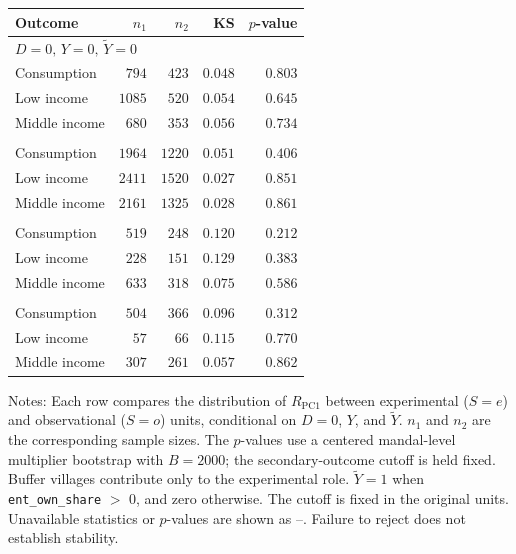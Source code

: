\begin{threeparttable}
\begin{tabular}{lrrrr}
\toprule
Outcome & $n_1$ & $n_2$ & KS & $p$-value \\
\midrule
\multicolumn{5}{l}{$D=0,\,Y=0,\,\widetilde{Y}=0$}\\
\quad Consumption & $794$ & $423$ & $0.048$ & $0.803$ \\
\quad Low income & $1085$ & $520$ & $0.054$ & $0.645$ \\
\quad Middle income & $680$ & $353$ & $0.056$ & $0.734$ \\
\addlinespace[0.6em]
\multicolumn{5}{l}{$D=0,\,Y=0,\,\widetilde{Y}=1$}\\
\quad Consumption & $1964$ & $1220$ & $0.051$ & $0.406$ \\
\quad Low income & $2411$ & $1520$ & $0.027$ & $0.851$ \\
\quad Middle income & $2161$ & $1325$ & $0.028$ & $0.861$ \\
\addlinespace[0.6em]
\multicolumn{5}{l}{$D=0,\,Y=1,\,\widetilde{Y}=0$}\\
\quad Consumption & $519$ & $248$ & $0.120$ & $0.212$ \\
\quad Low income & $228$ & $151$ & $0.129$ & $0.383$ \\
\quad Middle income & $633$ & $318$ & $0.075$ & $0.586$ \\
\addlinespace[0.6em]
\multicolumn{5}{l}{$D=0,\,Y=1,\,\widetilde{Y}=1$}\\
\quad Consumption & $504$ & $366$ & $0.096$ & $0.312$ \\
\quad Low income & $57$ & $66$ & $0.115$ & $0.770$ \\
\quad Middle income & $307$ & $261$ & $0.057$ & $0.862$ \\
\bottomrule
\end{tabular}
\begin{tablenotes}[flushleft]
\small
\item Notes: Each row compares the distribution of $R_{\mathrm{PC1}}$ between experimental ($S=e$) and observational ($S=o$) units, conditional on $D=0$, $Y$, and $\widetilde{Y}$. $n_1$ and $n_2$ are the corresponding sample sizes. The $p$-values use a centered mandal-level multiplier bootstrap with $B=2000$; the secondary-outcome cutoff is held fixed. Buffer villages contribute only to the experimental role. $\widetilde{Y}=1$ when \texttt{ent\_own\_share} $>$ 0, and zero otherwise. The cutoff is fixed in the original units. Unavailable statistics or $p$-values are shown as --. Failure to reject does not establish stability.
\end{tablenotes}
\end{threeparttable}

